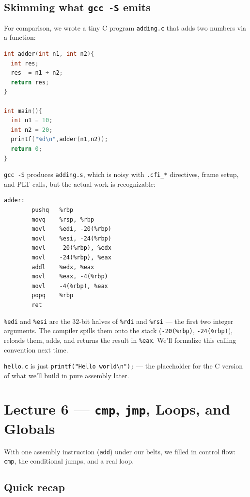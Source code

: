 \documentclass[11pt]{article}
\begin{document}
\subsection*{Skimming what \texttt{gcc -S} emits}

For comparison, we wrote a tiny C program \texttt{adding.c} that
adds two numbers via a function:

\begin{lstlisting}[language=C]
int adder(int n1, int n2){
  int res;
  res  = n1 + n2;
  return res;
}

int main(){
  int n1 = 10;
  int n2 = 20;
  printf("%d\n",adder(n1,n2));
  return 0;
}
\end{lstlisting}

\texttt{gcc -S} produces \texttt{adding.s}, which is noisy with
\texttt{.cfi\_*} directives, frame setup, and PLT calls, but the
actual work is recognizable:

\begin{lstlisting}
adder:
        pushq   %rbp
        movq    %rsp, %rbp
        movl    %edi, -20(%rbp)
        movl    %esi, -24(%rbp)
        movl    -20(%rbp), %edx
        movl    -24(%rbp), %eax
        addl    %edx, %eax
        movl    %eax, -4(%rbp)
        movl    -4(%rbp), %eax
        popq    %rbp
        ret
\end{lstlisting}

\texttt{\%edi} and \texttt{\%esi} are the 32-bit halves of
\texttt{\%rdi} and \texttt{\%rsi} --- the first two integer
arguments. The compiler spills them onto the stack
(\texttt{-20(\%rbp)}, \texttt{-24(\%rbp)}), reloads them, adds, and
returns the result in \texttt{\%eax}. We'll formalize this calling
convention next time.

\texttt{hello.c} is just \texttt{printf("Hello world\textbackslash n");}
--- the placeholder for the C version of what we'll build in pure
assembly later.

\section{Lecture 6 --- \texttt{cmp}, \texttt{jmp}, Loops, and Globals}

With one assembly instruction (\texttt{add}) under our belts, we
filled in control flow: \texttt{cmp}, the conditional jumps, and a
real loop.

\subsection*{Quick recap}
\end{document}
